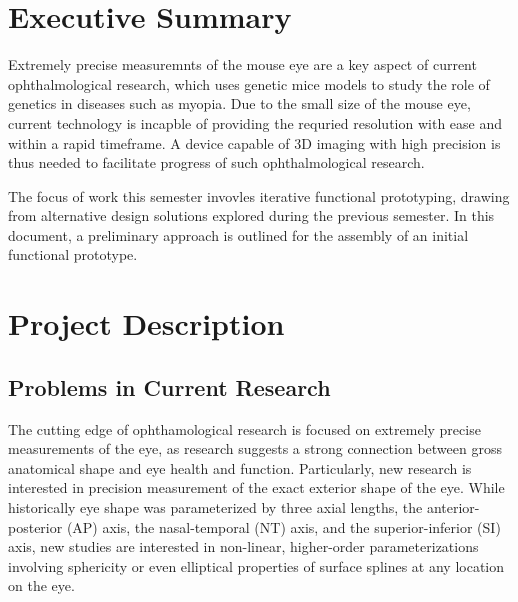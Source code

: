 \documentclass{article}
\begin{document}

\setcounter{tocdepth}{2}
\tableofcontents
\newpage
\listoftables
\listoffigures
\newpage


\section{Executive Summary}
\label{sec:exec-summary}
Extremely precise measuremnts of the mouse eye are a key aspect of current ophthalmological research, which uses genetic mice models to study the role of genetics in diseases such as myopia. Due to the small size of the mouse eye, current technology is incapble of providing the requried resolution with ease and within a rapid timeframe. A device capable of 3D imaging with high precision is thus needed to facilitate progress of such ophthalmological research. 

The focus of work this semester invovles iterative functional prototyping, drawing from alternative design solutions explored during the previous semester. In this document, a preliminary approach is outlined for the assembly of an initial functional prototype.

\newpage

\section{Project Description}
\label{sec:project-description}

\subsection{Problems in Current Research}
\label{sec:probl-curr-rese}

The cutting edge of ophthamological research is focused on extremely precise measurements of the eye, as research suggests a strong connection between gross anatomical shape and eye health and function. Particularly, new research is interested in precision measurement of the exact exterior shape of the eye\cite{atchison04,zhou99:genes,zhou99:models,guggenheim04,wallman04}. While historically eye shape was parameterized by three axial lengths, the anterior-posterior (AP) axis, the nasal-temporal (NT) axis, and the superior-inferior (SI) axis, new studies are interested in non-linear, higher-order parameterizations involving sphericity or even elliptical properties of surface splines at any location on the eye.
\end{document}
